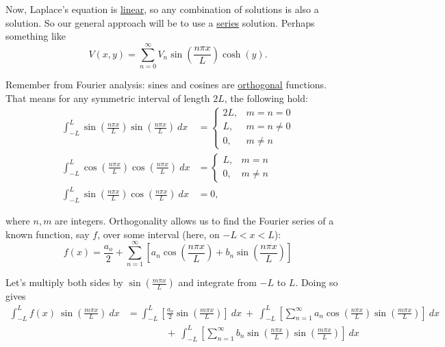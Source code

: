 \documentclass{article}
\numberwithin{equation}{section}
\begin{document}
Now, Laplace's equation is \underline{linear}, so any combination of solutions is also a solution. So our general approach will be to use a \underline{series} solution. Perhaps something like
\begin{equation*}
    V(x, y) = \sum\limits_{n = 0}^{\infty} V_n \sin{\left( \frac{n \pi x}{L} \right)} \cosh{\left( y \right)}.
\end{equation*}

Remember from Fourier analysis: sines and cosines are \underline{orthogonal} functions. That means for any symmetric interval of length $2L$, the following hold:
\begin{align*}
    \int_{-L}^{L} \sin{\left( \frac{n\pi x}{L} \right)} \sin{\left( \frac{n\pi x}{L} \right)}\ dx &= \begin{cases} \displaystyle 2L, & m = n = 0 \\ \displaystyle L, & m = n \neq 0 \\ \displaystyle 0, & m \neq n \end{cases} \\
    \int_{-L}^{L} \cos{\left( \frac{n\pi x}{L} \right)} \cos{\left( \frac{n\pi x}{L} \right)}\ dx &= \begin{cases} \displaystyle L, & m = n \\ \displaystyle 0, & m \neq n \end{cases} \\
    \int_{-L}^{L} \sin{\left( \frac{n\pi x}{L} \right)} \cos{\left( \frac{n\pi x}{L} \right)}\ dx &= 0,
\end{align*}

where $n, m$ are integers. Orthogonality allows us to find the Fourier series of a known function, say $f$, over some interval (here, on $-L < x < L$):
\begin{equation*}
    f(x) = \frac{a_o}{2} + \sum\limits_{n = 1}^{\infty} \left[ a_n \cos{\left( \frac{n\pi x}{L} \right)} + b_n \sin{\left( \frac{n\pi x}{L} \right)}  \right]
\end{equation*}

Let's multiply both sides by $\sin{\left( \frac{m\pi x}{L} \right)}$ and integrate from $-L$ to $L$. Doing so gives
\begin{align*}
    \int_{-L}^{L} f(x)\ \sin{\left( \frac{m\pi x}{L} \right)}\ dx &= \int_{-L}^{L} \left[ \frac{a_o}{2} \sin{\left( \frac{m\pi x}{L} \right)} \right]\ dx\ +\ \int_{-L}^{L} \left[ \sum_{n=1}^{\infty} a_n \cos{\left( \frac{n\pi x}{L} \right)} \sin{\left( \frac{m\pi x}{L} \right)} \right]\ dx \\
    &\qquad\qquad +\ \int_{-L}^{L} \left[ \sum_{n=1}^{\infty} b_n \sin{\left( \frac{n\pi x}{L} \right)} \sin{\left( \frac{m\pi x}{L} \right)} \right]\ dx
\end{align*}
\end{document}
